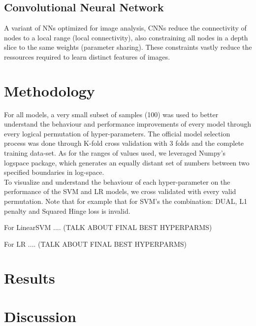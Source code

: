 \documentclass[10pt, hidelinks]{article}
\begin{document}
\subsection*{Convolutional Neural Network}
A variant of NNs optimized for image analysis, CNNs reduce the connectivity of nodes to a local range (local connectivity), also constraining all nodes in a depth slice to the same weights (parameter sharing). These constraints vastly reduce the ressources required to learn distinct features of images.

\section*{Methodology}

For all models, a very small subset of samples (100) was used to better understand the behaviour and performance improvements of every model through every logical permutation of hyper-parameters. The official model selection process was done through K-fold cross validation with 3 folds and the complete training data-set. As for the ranges of values used, we leveraged Numpy's logspace package, which generates an equally distant set of numbers between two specified boundaries in log-space.\\
\noindent To visualize and understand the behaviour of each hyper-parameter on the performance of the SVM and LR models, we cross validated with every valid permutation. Note that for example that for SVM's the combination: DUAL, L1 penalty and Squared Hinge loss is invalid.

\noindent For LinearSVM .... (TALK ABOUT FINAL BEST HYPERPARMS)

\noindent For LR .... (TALK ABOUT FINAL BEST HYPERPARMS)

\section*{Results}

\section*{Discussion}
\end{document}
